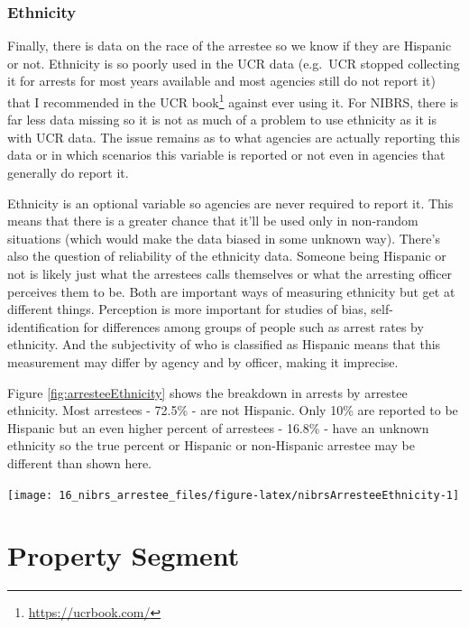 \documentclass[
]{krantz}
\let\origfigure\figure
\let\endorigfigure\endfigure
\renewenvironment{figure}[1][2] {
    \expandafter\origfigure\expandafter[H]
} {
    \endorigfigure
}
\renewcommand{\href}[2]{#2\footnote{\url{#1}}}
\begin{document}
\subsection{Ethnicity}\label{ethnicity-4}

Finally, there is data on the race of the arrestee so we
know if they are Hispanic or not. Ethnicity is so poorly
used in the UCR data (e.g.~UCR stopped collecting it for
arrests for most years available and most agencies still do
not report it) that I recommended in the
\href{https://ucrbook.com/}{UCR book} against ever using it.
For NIBRS, there is far less data missing so it is not as
much of a problem to use ethnicity as it is with UCR data.
The issue remains as to what agencies are actually reporting
this data or in which scenarios this variable is reported or
not even in agencies that generally do report it.

Ethnicity is an optional variable so agencies are never
required to report it. This means that there is a greater
chance that it'll be used only in non-random situations
(which would make the data biased in some unknown way).
There's also the question of reliability of the ethnicity
data. Someone being Hispanic or not is likely just what the
arrestees calls themselves or what the arresting officer
perceives them to be. Both are important ways of measuring
ethnicity but get at different things. Perception is more
important for studies of bias, self-identification for
differences among groups of people such as arrest rates by
ethnicity. And the subjectivity of who is classified as
Hispanic means that this measurement may differ by agency
and by officer, making it imprecise.

Figure \ref{fig:arresteeEthnicity} shows the breakdown in
arrests by arrestee ethnicity. Most arrestees - 72.5\% - are
not Hispanic. Only 10\% are reported to be Hispanic but an
even higher percent of arrestees - 16.8\% - have an unknown
ethnicity so the true percent or Hispanic or non-Hispanic
arrestee may be different than shown here.

\begin{figure}

{\centering \texttt{[image: 16\_nibrs\_arrestee\_files/figure-latex/nibrsArresteeEthnicity-1]} 

}

\caption{The share of arrestees by ethnicity, 1991-2022.}\label{fig:nibrsArresteeEthnicity}
\end{figure}

\chapter{Property Segment}\label{property}
\end{document}
